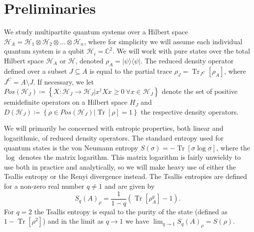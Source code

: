 \documentclass{article}
\DeclareMathOperator{\Tr}{Tr}
\newcommand{\ketbra}[2]{| #1\rangle\! \langle #2|}
\newcommand{\brackets}[1]{\left[ #1 \right]}
\newcommand{\set}[1]{\left\{ #1 \right\}}
\newcommand{\trace}[1]{\Tr \brackets{ #1 }}
\newcommand{\partrace}[2]{\Tr_{#1} \brackets{ #2 }}
\newcommand{\hilb}{\mathcal{H}}
\begin{document}
\section{Preliminaries}\label{sec:prelims}


We study multipartite quantum systems over a Hilbert space $\hilb_A = \hilb_{1} \otimes \hilb_{2} \otimes \ldots \otimes \hilb_{n}$, where for simplicity we will assume each individual quantum system is a qubit $\hilb_{i} = \mathbb{C}^{2}$. We will work with pure states over the total Hilbert space $\hilb_A$ or $\hilb$, denoted $\rho_A = \ketbra{\psi}{\psi}$. The reduced density operator defined over a subset $J \subseteq A$ is equal to the partial trace $\rho_J = \partrace{J^C}{\rho_A}$, where $J^C = A \setminus J$. If necessary, we let $Pos(\hilb_J) \coloneqq \set{X: \hilb_J \to \hilb_J | x^\dagger X x \geq 0 ~\forall x \in \hilb_J}$ denote the set of positive semidefinite operators on a Hilbert space $H_J$ and $D(\hilb_J) \coloneqq \set{\rho \in Pos(\hilb_J) | \trace{\rho} = 1}$ the respective density operators. 

We will primarily be concerned with entropic properties, both linear and logarithmic, of reduced density operators. The standard entropy used for quantum states is the von Neumann entropy $S(\sigma) = - \trace{\sigma \log \sigma}$, where the $\log$ denotes the matrix logarithm. This matrix logarithm is fairly unwieldy to use both in practice and analytically, so we will make heavy use of either the Tsallis entropy or the Renyi divergence instead. The Tsallis entropies are defined for a non-zero real number $q \neq 1$ and are given by
\begin{equation}
    S_{q}(A)_{\rho} = \frac{1}{1 - q} (\trace{\rho_A^q} - 1).
\end{equation}
For $q=2$ the Tsallis entropy is equal to the purity of the state (defined as $1 - \trace{\rho^2}$) and in the limit as $q \to 1$ we have $\lim_{q \to 1} S_q(A)_{\rho} = S(\rho)$. 
\end{document}
